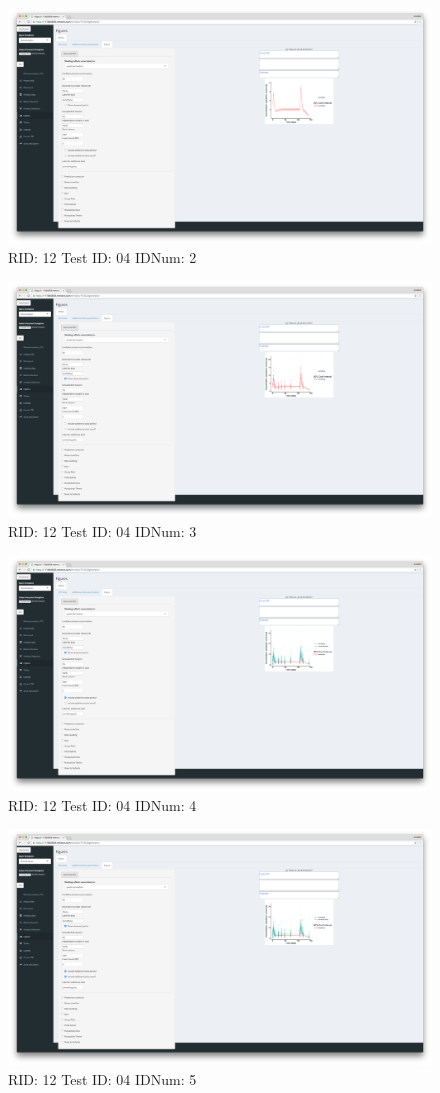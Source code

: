 \begin{figure}[H]
\includegraphics[width=.8\textwidth]{screencaps/12-04-2.png}
\caption{RID: 12 Test ID: 04 IDNum: 2}
\end{figure}
\begin{figure}[H]
\includegraphics[width=.8\textwidth]{screencaps/12-04-3.png}
\caption{RID: 12 Test ID: 04 IDNum: 3}
\end{figure}
\begin{figure}[H]
\includegraphics[width=.8\textwidth]{screencaps/12-04-4.png}
\caption{RID: 12 Test ID: 04 IDNum: 4}
\end{figure}
\begin{figure}[H]
\includegraphics[width=.8\textwidth]{screencaps/12-04-5.png}
\caption{RID: 12 Test ID: 04 IDNum: 5}
\end{figure}
